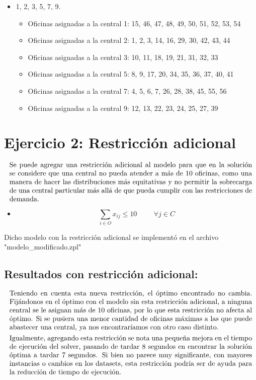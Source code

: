 \documentclass{article}
\begin{document}
\begin{itemize}
    \item{} 1, 2, 3, 5, 7, 9.
	\begin{itemize}
	\item Oficinas asignadas a la central 1: 15, 46, 47, 48, 49, 50, 51, 52, 53, 54
	\item Oficinas asignadas a la central 2: 1, 2, 3, 14, 16, 29, 30, 42, 43, 44
	\item Oficinas asignadas a la central 3: 10, 11, 18, 19, 21, 31, 32, 33
	\item Oficinas asignadas a la central 5: 8, 9, 17, 20, 34, 35, 36, 37, 40, 41
	\item Oficinas asignadas a la central 7: 4, 5, 6, 7, 26, 28, 38, 45, 55, 56
	\item Oficinas asignadas a la central 9: 12, 13, 22, 23, 24, 25, 27, 39
	\end{itemize}
\end{itemize}



\section*{Ejercicio 2: Restricción adicional}
\[
\parbox{\textwidth}{Se puede agregar una restricción adicional al modelo para que en la solución se considere que una central no pueda atender a más de 10 oficinas, como una manera de hacer las distribuciones más equitativas y no permitir la sobrecarga de una central particular más allá de que pueda cumplir con las restricciones de demanda.}
\]


\begin{itemize}
    \item {}
    \[
   \sum_{i \in O} x_{ij} \leq 10 \hspace{1cm}\forall j \in C
    \]
\end{itemize}

Dicho modelo con la restricción adicional se implementó en el archivo "modelo_modificado.zpl"

\subsection*{Resultados con restricción adicional:}
\[
\parbox{\textwidth}{Teniendo en cuenta esta nueva restricción, el óptimo encontrado no cambia. Fijándonos en el óptimo con el modelo sin esta restricción adicional, a ninguna central se le asignan más de 10 oficinas, por lo que esta restricción no afecta al óptimo. Si se pusiera una menor cantidad de oficinas máximas a las que puede abastecer una central, ya nos encontraríamos con otro caso distinto.}
\]
\[
\parbox{\textwidth}{Igualmente, agregando esta restricción se nota una pequeña mejora en el tiempo de ejecución del solver, pasando de tardar 8 segundos en encontrar la solución óptima a tardar 7 segundos. Si bien no parece muy significante, con mayores instancias o cambios en los datasets, esta restricción podría ser de ayuda para la reducción de tiempo de ejecución.}
\]
\end{document}
